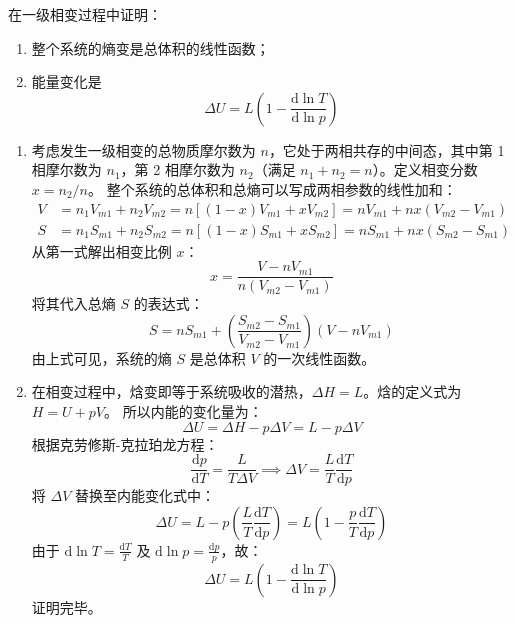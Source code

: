 \begin{exercise}\label{ex:14.9}
在一级相变过程中证明：
\begin{enumerate}
  \item[(a)] 整个系统的熵变是总体积的线性函数；
  \item[(b)] 能量变化是
  $$ \Delta U = L \left( 1 - \frac{\mathrm{d}\ln T}{\mathrm{d}\ln p} \right) $$
\end{enumerate}
\end{exercise}
\begin{solution}
\begin{enumerate}
    \item[(a)] 考虑发生一级相变的总物质摩尔数为 $n$，它处于两相共存的中间态，其中第 1 相摩尔数为 $n_1$，第 2 相摩尔数为 $n_2$（满足 $n_1 + n_2 = n$）。定义相变分数 $x = n_2 / n$。
    整个系统的总体积和总熵可以写成两相参数的线性加和：
    \begin{align*}
        V &= n_1 V_{m1} + n_2 V_{m2} = n \left[ (1 - x) V_{m1} + x V_{m2} \right] = n V_{m1} + n x (V_{m2} - V_{m1}) \\
        S &= n_1 S_{m1} + n_2 S_{m2} = n \left[ (1 - x) S_{m1} + x S_{m2} \right] = n S_{m1} + n x (S_{m2} - S_{m1})
    \end{align*}
    从第一式解出相变比例 $x$：
    $$ x = \frac{V - n V_{m1}}{n (V_{m2} - V_{m1})} $$
    将其代入总熵 $S$ 的表达式：
    $$ S = n S_{m1} + \left( \frac{S_{m2} - S_{m1}}{V_{m2} - V_{m1}} \right) (V - n V_{m1}) $$
    由上式可见，系统的熵 $S$ 是总体积 $V$ 的一次线性函数。

    \item[(b)] 在相变过程中，焓变即等于系统吸收的潜热，$\Delta H = L$。焓的定义式为 $H = U + pV$。
    所以内能的变化量为：
    $$ \Delta U = \Delta H - p \Delta V = L - p \Delta V $$
    根据克劳修斯-克拉珀龙方程：
    $$ \frac{\mathrm{d}p}{\mathrm{d}T} = \frac{L}{T \Delta V} \implies \Delta V = \frac{L}{T} \frac{\mathrm{d}T}{\mathrm{d}p} $$
    将 $\Delta V$ 替换至内能变化式中：
    $$ \Delta U = L - p \left( \frac{L}{T} \frac{\mathrm{d}T}{\mathrm{d}p} \right) = L \left( 1 - \frac{p}{T} \frac{\mathrm{d}T}{\mathrm{d}p} \right) $$
    由于 $\mathrm{d}\ln T = \frac{\mathrm{d}T}{T}$ 及 $\mathrm{d}\ln p = \frac{\mathrm{d}p}{p}$，故：
    $$ \Delta U = L \left( 1 - \frac{\mathrm{d}\ln T}{\mathrm{d}\ln p} \right) $$
    证明完毕。
\end{enumerate}
\end{solution}

